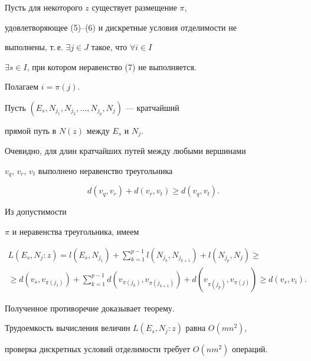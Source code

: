 \begin{pf}


Пусть для некоторого $z$ существует размещение $\pi$,


удовлетворяющее (5)--(6) и дискретные условия отделимости не


выполнены, т.\,е. $\exists j \in J$ такое, что $\forall i \in I$


$\exists s \in I$, при котором неравенство (7) не выполняется.


Полагаем $i=\pi(j)$.


Пусть $(E_{s},N_{j_{1}},N_{j_{2}},\dotsc,N_{j_{p}},N_{j})$ --- кратчайший


прямой путь в $N(z)$ между $E_{s}$ и $N_{j}$.


Очевидно, для длин кратчайших путей между любыми вершинами


$v_{q}$, $v_{r}$, $v_{t}$ выполнено неравенство треугольника


$$


d(v_{q},v_{r}) + d(v_{r},v_{t}) \geq d(v_{q},v_{t}).


$$


Из допустимости


$\pi$ и неравенства треугольника, имеем


\begin{multline*}


L(E_{s},N_{j}:z)=l(E_{s},N_{j_{1}})+


\sum_{k=1}^{p-1} l(N_{j_{k}},N_{j_{k+1}}) + l(N_{j_{p}},N_{j}) \geq \\


\ge d(v_{s},v_{\pi(j_{1})})+


\sum_{k=1}^{p-1} d(v_{\pi(j_{k})},v_{\pi(j_{k+1})}) +


d(v_{\pi(j_{p})},v_{\pi(j)}) \geq d(v_{s},v_{i}).


\end{multline*}


Полученное противоречие доказывает теорему.


\end{pf}





Трудоемкость вычисления величин $L(E_{s},N_{j}:z)$ равна $O(mn^2)$,


проверка дискретных условий отделимости требует $O(nm^2)$ операций.


\medskip





